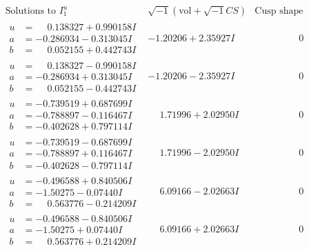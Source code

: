 \documentclass[1p]{elsarticle_modified}
\theoremstyle{definition}
\newcommand{\I}{\sqrt{-1}}
\begin{document}
$$\begin{array}{c|c|c}  
\text{Solutions to }I^u_{1}& \I (\text{vol} + \sqrt{-1}CS) & \text{Cusp shape}\\
 \hline 
\begin{aligned}
u &= \phantom{-}0.138327 + 0.990158 I \\
a &= -0.286934 - 0.313045 I \\
b &= \phantom{-}0.052155 + 0.442743 I\end{aligned}
 & -1.20206 + 2.35927 I & \phantom{-0.000000 } 0 \\ \hline\begin{aligned}
u &= \phantom{-}0.138327 - 0.990158 I \\
a &= -0.286934 + 0.313045 I \\
b &= \phantom{-}0.052155 - 0.442743 I\end{aligned}
 & -1.20206 - 2.35927 I & \phantom{-0.000000 } 0 \\ \hline\begin{aligned}
u &= -0.739519 + 0.687699 I \\
a &= -0.788897 - 0.116467 I \\
b &= -0.402628 + 0.797114 I\end{aligned}
 & \phantom{-}1.71996 + 2.02950 I & \phantom{-0.000000 } 0 \\ \hline\begin{aligned}
u &= -0.739519 - 0.687699 I \\
a &= -0.788897 + 0.116467 I \\
b &= -0.402628 - 0.797114 I\end{aligned}
 & \phantom{-}1.71996 - 2.02950 I & \phantom{-0.000000 } 0 \\ \hline\begin{aligned}
u &= -0.496588 + 0.840506 I \\
a &= -1.50275 - 0.07440 I \\
b &= \phantom{-}0.563776 - 0.214209 I\end{aligned}
 & \phantom{-}6.09166 - 2.02663 I & \phantom{-0.000000 } 0 \\ \hline\begin{aligned}
u &= -0.496588 - 0.840506 I \\
a &= -1.50275 + 0.07440 I \\
b &= \phantom{-}0.563776 + 0.214209 I\end{aligned}
 & \phantom{-}6.09166 + 2.02663 I & \phantom{-0.000000 } 0 \\ \hline\begin{aligned}

\end{aligned}
\end{array}$$
\end{document}
